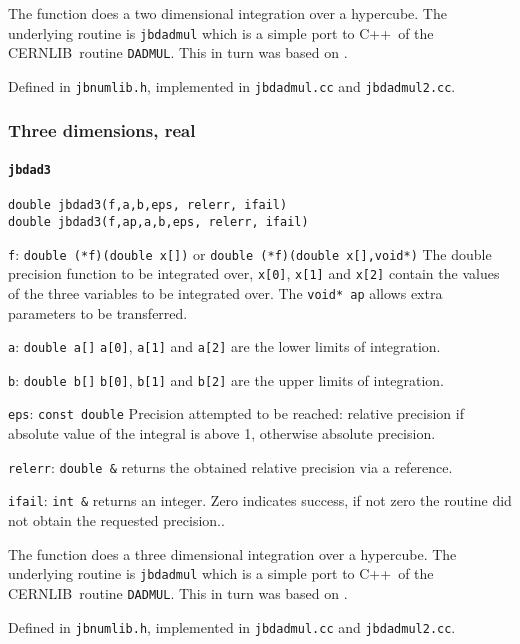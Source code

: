 \documentclass[12pt,a4paper]{article}
\newcommand{\mytt}[1]{\texttt{#1}}
\newcommand{\newfunction}[1]{\mytt{#1}\index{\mytt{#1}}}
\newcommand{\cernlib}{\textsc{CERNLIB}\cite{cernlib}}
\newcommand{\cpp}{\textsc{C++}}
\begin{document}
The function does a two dimensional integration over a hypercube.
The underlying routine is \mytt{jbdadmul} which is
a simple port to \cpp\ of the \cernlib\ routine
 \mytt{DADMUL}. This in turn was based on \cite{radmulpaper}.

Defined in \mytt{jbnumlib.h}, implemented in \mytt{jbdadmul.cc} and
\mytt{jbdadmul2.cc}.

\subsubsection{Three dimensions, real}
\paragraph{\newfunction{jbdad3}}

\mytt{double jbdad3(f,a,b,eps, relerr, ifail)}\\
\mytt{double jbdad3(f,ap,a,b,eps, relerr, ifail)}

\mytt{f}: \mytt{double (*f)(double x[])}  or \mytt{double (*f)(double x[],void*)}
The double precision
function to be integrated over, \mytt{x[0]}, \mytt{x[1]} and  \mytt{x[2]}
contain the values of the three variables to be integrated over.
The \mytt{void* ap} allows extra parameters to be transferred. 

\mytt{a}: \mytt{double a[]}  \mytt{a[0]}, \mytt{a[1]} and \mytt{a[2]} are the lower limits of integration.

\mytt{b}: \mytt{double b[]}  \mytt{b[0]}, \mytt{b[1]} and \mytt{b[2]} are the upper limits of integration.

\mytt{eps}: \mytt{const double} Precision attempted to be reached:
relative precision if absolute
value of the integral is above 1, otherwise absolute precision.

\mytt{relerr}: \mytt{double \&} returns the obtained relative precision
via a reference.

\mytt{ifail}: \mytt{int \&} returns an integer. Zero indicates success,
if not zero the routine did not obtain the requested precision..

The function does a three dimensional integration over a hypercube.
The underlying routine is \mytt{jbdadmul} which is
a simple port to \cpp\ of the \cernlib\ routine
 \mytt{DADMUL}. This in turn was based on \cite{radmulpaper}.

Defined in \mytt{jbnumlib.h}, implemented in \mytt{jbdadmul.cc} and
\mytt{jbdadmul2.cc}.

\end{document}
